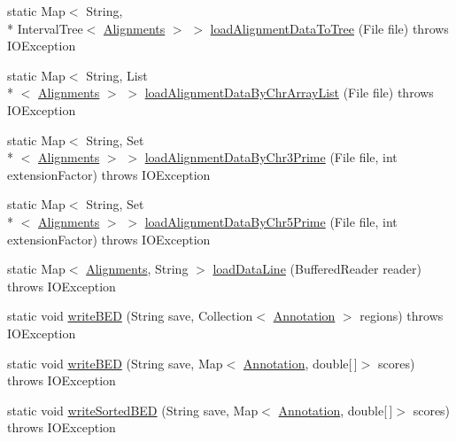 \begin{DoxyCompactItemize}
static Map$<$ String, \\*
Interval\+Tree$<$ \hyperlink{classbroad_1_1pda_1_1datastructures_1_1_alignments}{Alignments} $>$ $>$ \hyperlink{classbroad_1_1pda_1_1annotation_1_1_b_e_d_file_parser_a75330bb06c49493e924ee6881b613973}{load\+Alignment\+Data\+To\+Tree} (File file)  throws I\+O\+Exception
\item 
static Map$<$ String, List\\*
$<$ \hyperlink{classbroad_1_1pda_1_1datastructures_1_1_alignments}{Alignments} $>$ $>$ \hyperlink{classbroad_1_1pda_1_1annotation_1_1_b_e_d_file_parser_add1539c7331ebe6288a0ac5fd6898574}{load\+Alignment\+Data\+By\+Chr\+Array\+List} (File file)  throws I\+O\+Exception
\item 
static Map$<$ String, Set\\*
$<$ \hyperlink{classbroad_1_1pda_1_1datastructures_1_1_alignments}{Alignments} $>$ $>$ \hyperlink{classbroad_1_1pda_1_1annotation_1_1_b_e_d_file_parser_a24526cfded9ae62cb64f1b40562a360a}{load\+Alignment\+Data\+By\+Chr3\+Prime} (File file, int extension\+Factor)  throws I\+O\+Exception
\item 
static Map$<$ String, Set\\*
$<$ \hyperlink{classbroad_1_1pda_1_1datastructures_1_1_alignments}{Alignments} $>$ $>$ \hyperlink{classbroad_1_1pda_1_1annotation_1_1_b_e_d_file_parser_a18e2a417e5e04c4cabee937707742f8d}{load\+Alignment\+Data\+By\+Chr5\+Prime} (File file, int extension\+Factor)  throws I\+O\+Exception
\item 
static Map$<$ \hyperlink{classbroad_1_1pda_1_1datastructures_1_1_alignments}{Alignments}, String $>$ \hyperlink{classbroad_1_1pda_1_1annotation_1_1_b_e_d_file_parser_a2e477b1c570aa6cafcde69f782cd46f5}{load\+Data\+Line} (Buffered\+Reader reader)  throws I\+O\+Exception
\item 
static void \hyperlink{classbroad_1_1pda_1_1annotation_1_1_b_e_d_file_parser_a82d1c3ff1719b420ae996047497598d2}{write\+B\+E\+D} (String save, Collection$<$ \hyperlink{interfaceumms_1_1core_1_1annotation_1_1_annotation}{Annotation} $>$ regions)  throws I\+O\+Exception
\item 
static void \hyperlink{classbroad_1_1pda_1_1annotation_1_1_b_e_d_file_parser_a7cc9d1aa1b6645caf677afafc09928bc}{write\+B\+E\+D} (String save, Map$<$ \hyperlink{interfaceumms_1_1core_1_1annotation_1_1_annotation}{Annotation}, double\mbox{[}$\,$\mbox{]}$>$ scores)  throws I\+O\+Exception
\item 
static void \hyperlink{classbroad_1_1pda_1_1annotation_1_1_b_e_d_file_parser_aa1ff9b420a931689c4663567baaee8ab}{write\+Sorted\+B\+E\+D} (String save, Map$<$ \hyperlink{interfaceumms_1_1core_1_1annotation_1_1_annotation}{Annotation}, double\mbox{[}$\,$\mbox{]}$>$ scores)  throws I\+O\+Exception 

\end{DoxyCompactItemize}

